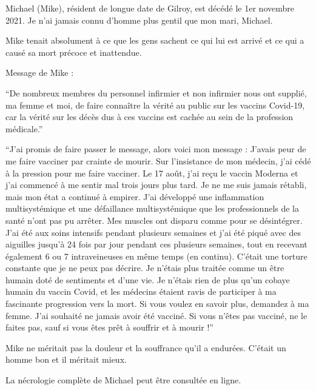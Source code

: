 
Michael (Mike), résident de longue date de Gilroy, est décédé le 1er novembre
2021. Je n'ai jamais connu d'homme plus gentil que mon mari, Michael.

Mike tenait absolument à ce que les gens sachent ce qui lui est arrivé et ce qui
a causé sa mort précoce et inattendue.

Message de Mike :

``De nombreux membres du personnel infirmier et non infirmier nous ont supplié,
ma femme et moi, de faire connaître la vérité au public sur les vaccins
Covid-19, car la vérité sur les décès dus à ces vaccins est cachée au sein de la
profession médicale.''

``J'ai promis de faire passer le message, alors voici mon message : J'avais peur
de me faire vacciner par crainte de mourir. Sur l'insistance de mon médecin,
j'ai cédé à la pression pour me faire vacciner. Le 17 août, j'ai reçu le vaccin
Moderna et j'ai commencé à me sentir mal trois jours plus tard. Je ne me suis
jamais rétabli, mais mon état a continué à empirer. J'ai développé une
inflammation multisystémique et une défaillance multisystémique que les
professionnels de la santé n'ont pas pu arrêter. Mes muscles ont disparu comme
pour se désintégrer. J'ai été aux soins intensifs pendant plusieurs semaines et
j'ai été piqué avec des aiguilles jusqu'à 24 fois par jour pendant ces plusieurs
semaines, tout en recevant également 6 ou 7 intraveineuses en même temps (en
continu). C'était une torture constante que je ne peux pas décrire. Je n'étais
plus traitée comme un être humain doté de sentiments et d'une vie. Je n'étais
rien de plus qu'un cobaye humain du vaccin Covid, et les médecins étaient ravis
de participer à ma fascinante progression vers la mort. Si vous voulez en savoir
plus, demandez à ma femme. J'ai souhaité ne jamais avoir été vacciné. Si vous
n'êtes pas vacciné, ne le faites pas, sauf si vous êtes prêt à souffrir et à
mourir !''

Mike ne méritait pas la douleur et la souffrance qu'il a endurées. C'était un
homme bon et il méritait mieux.

La nécrologie complète de Michael peut être consultée en ligne.
